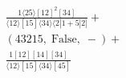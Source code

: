 \documentclass[varwidth, border=5pt]{standalone}
\begin{document}
\begin{my}
$\begin{gathered}
\scriptscriptstyle\frac{1⟨25⟩[12]^2[34]}{⟨12⟩[15]⟨34⟩⟨2|1+5|2]}+\\
\scriptscriptstyle(43215,\;\text{False},\;-)+\\
\scriptscriptstyle\frac{1[12][14][34]}{⟨12⟩[15]⟨34⟩[45]}\phantom{+}
\end{gathered}$
\end{my}
\end{document}

